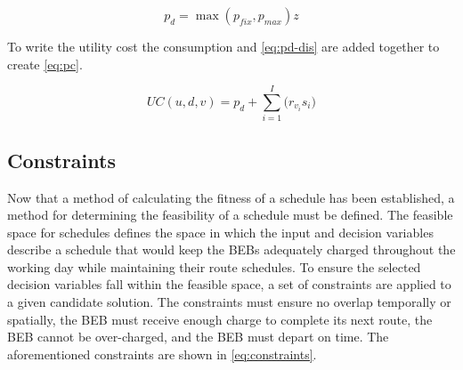 \documentclass[11pt,a4paper,final]{article}
\newcommand{\UC}{UC(u, d, v)}               %
\begin{document}
\begin{equation}
\label{eq:pd-dis}
  p_d = \max(p_{fix}, p_{max})z
\end{equation}

To write the utility cost the consumption and \ref{eq:pd-dis} are added together to create \ref{eq:pc}.

\begin{equation}
\label{eq:pc}
\UC = p_d + \sum_{i=1}^I \Big( r_{v_i}s_i \Big)
\end{equation}

\subsection{Constraints}
\label{sec:constraints}
Now that a method of calculating the fitness of a schedule has been established, a method for determining the
feasibility of a schedule must be defined. The feasible space for schedules defines the space in which the input and
decision variables describe a schedule that would keep the BEBs adequately charged throughout the working day while
maintaining their route schedules. To ensure the selected decision variables fall within the feasible space, a set of
constraints are applied to a given candidate solution. The constraints must ensure no overlap temporally or spatially,
the BEB must receive enough charge to complete its next route, the BEB cannot be over-charged, and the BEB must depart
on time. The aforementioned constraints are shown in \ref{eq:constraints}.
\end{document}
